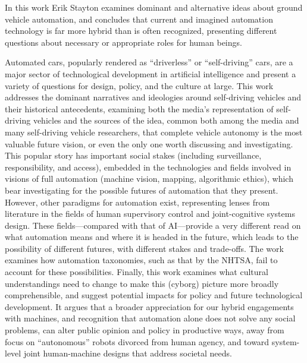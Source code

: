 % 
% 
%

In this work Erik Stayton examines dominant and alternative ideas about ground
vehicle automation, and concludes that current and imagined automation
technology is far more hybrid than 
is often recognized, presenting different questions about necessary or
appropriate roles for human beings.

Automated cars, popularly rendered as ``driverless'' or
``self-driving'' cars, are a major sector of technological
development in artificial intelligence and present a variety of
questions for design, policy, and the culture at large. This work addresses the
dominant narratives and ideologies around self-driving 
vehicles and their historical antecedents, examining both the media's representation
of self-driving vehicles and 
the sources of the idea, common both among the media and many
self-driving vehicle researchers, that complete vehicle autonomy is
the most valuable future vision, or even the only one  worth
discussing and investigating. 
This popular story has important social stakes (including
surveillance, responsibility, and access), embedded in the
technologies and fields involved in visions of full
automation (machine vision, mapping, algorithmic ethics), which bear investigating
for the possible futures of 
automation that they present.
However, other paradigms for automation exist,
representing lenses from
literature in the fields of human supervisory control and
joint-cognitive systems design. These fields---compared with
that of AI---provide a very
different read on what automation means and where it is headed in the
future, which leads to the possibility of different futures, with
different stakes and trade-offs. The work examines how automation
taxonomies, such as that by the NHTSA, fail to account for these
possibilities. Finally, this work examines what cultural 
understandings need to change to 
make this (cyborg) picture more broadly comprehensible, and suggest potential
impacts for policy and future technological development. It argues that
a broader appreciation for 
our hybrid engagements with machines, and recognition that automation
alone does not solve any social problems, can alter public
opinion and policy in productive ways, away from focus on
``autonomous'' robots divorced from human agency, and toward
system-level joint human-machine designs that address societal needs. 
